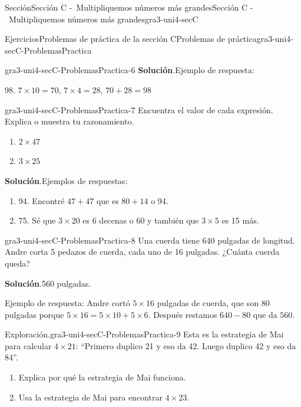 \documentclass[oneside,10pt,]{article}
\newcommand{\blocktitlefont}{\relax}
\begin{document}
\begin{sectionptx}{Sección}{Sección C -~Multipliquemos números más grandes}{}{Sección C -~Multipliquemos números más grandes}{}{}{gra3-uni4-secC}
\begin{exercises-subsection}{Ejercicios}{Problemas de práctica de la sección C}{}{Problemas de práctica}{}{}{gra3-uni4-secC-ProblemasPractica}
\begin{divisionexercise}{4}{}{}{gra3-uni4-secC-ProblemasPractica-6}
\noindent\textbf{\blocktitlefont Solución}.\hypertarget{gra3-uni4-secC-ProblemasPractica-6-2}{}\quad{}Ejemplo de respuesta:%
\par
98. \(7 \times 10 = 70\), \(7 \times 4 = 28\), \(70 + 28 = 98\)%
\end{divisionexercise}%
\begin{divisionexercise}{5}{}{}{gra3-uni4-secC-ProblemasPractica-7}%
Encuentra el valor de cada expresión. Explica o muestra tu razonamiento.%
%
\begin{enumerate}[label={(\alph*)}]
\item{}\(\displaystyle 2 \times 47\)%
\item{}\(\displaystyle 3 \times 25\)%
\end{enumerate}
\par\smallskip%
\noindent\textbf{\blocktitlefont Solución}.\hypertarget{gra3-uni4-secC-ProblemasPractica-7-2}{}\quad{}Ejemplos de respuestas:%
%
\begin{enumerate}[label={(\alph*)}]
\item{}94. Encontré \(47 + 47\) que es \(80 + 14\) o 94.%
\item{}75. Sé que \(3 \times 20\) es 6 decenas o 60 y también que \(3 \times 5\) es 15 más.%
\end{enumerate}
\end{divisionexercise}%
\begin{divisionexercise}{6}{}{}{gra3-uni4-secC-ProblemasPractica-8}%
Una cuerda tiene 640 pulgadas de longitud. Andre corta 5 pedazos de cuerda, cada uno de 16 pulgadas. ¿Cuánta cuerda queda?%
\par\smallskip%
\noindent\textbf{\blocktitlefont Solución}.\hypertarget{gra3-uni4-secC-ProblemasPractica-8-2}{}\quad{}560 pulgadas.%
\par
Ejemplo de respuesta: Andre cortó \(5 \times 16\) pulgadas de cuerda, que son 80 pulgadas porque \(5 \times 16 = 5 \times 10 + 5 \times 6\). Después restamos \(640 - 80\) que da \(560\).%
\end{divisionexercise}%
\begin{divisionexercise}{7}{Exploración.}{}{gra3-uni4-secC-ProblemasPractica-9}%
Esta es la estrategia de Mai para calcular \(4 \times 21\): “Primero duplico 21 y eso da 42. Luego duplico 42 y eso da 84”.%
%
\begin{enumerate}[label={(\alph*)}]
\item{}Explica por qué la estrategia de Mai funciona.%
\item{}Usa la estrategia de Mai para encontrar \(4 \times 23\).%

\end{enumerate}
\end{divisionexercise}
\end{exercises-subsection}
\end{sectionptx}
\end{document}
